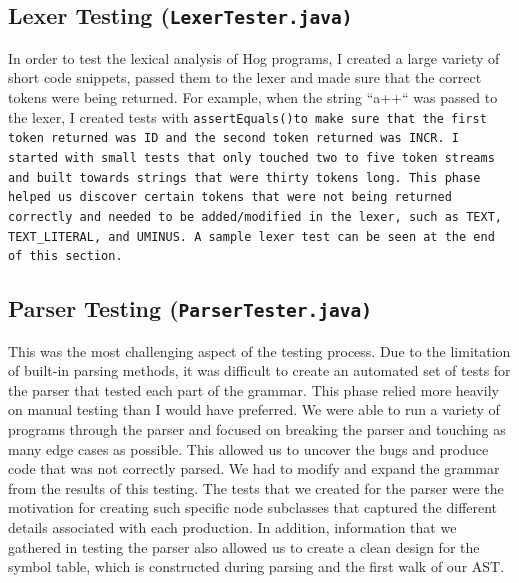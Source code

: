 \documentclass{report}
\begin{document}
\subsection*{Lexer Testing (\tt LexerTester.java\rm)}
 
In order to test the lexical analysis of Hog programs, I created a large variety of short code snippets, passed them to the lexer and made sure that the correct tokens were being returned. For example, when the string ``a++`` was passed to the lexer, I created tests with \tt assertEquals()\rm to make sure that the first token returned was ID and the second token returned was INCR. I started with small tests that only touched two to five token streams and built towards strings that were thirty tokens long. This phase helped us discover certain tokens that were not being returned correctly and needed to be added/modified in the lexer, such as \tt TEXT\rm, \tt TEXT\_LITERAL\rm, and \tt UMINUS\rm. A sample lexer test can be seen at the end of this section.

\subsection*{Parser Testing (\tt ParserTester.java\rm)}

This was the most challenging aspect of the testing process. Due to the limitation of built-in parsing methods, it was difficult to create an automated set of tests for the parser that tested each part of the grammar. This phase relied more heavily on manual testing than I would have preferred. We were able to run a variety of programs through the parser and focused on breaking the parser and touching as many edge cases as possible. This allowed us to uncover the bugs and produce code that was not correctly parsed. We had to modify and expand the grammar from the results of this testing. The tests that we created for the parser were the motivation for creating such specific node subclasses that captured the different details associated with each production. In addition, information that we gathered in testing the parser also allowed us to create a clean design for the symbol table, which is constructed during parsing and the first walk of our AST.
\end{document}
